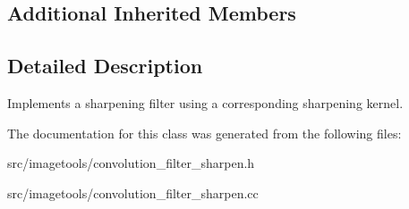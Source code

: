 \subsection*{Additional Inherited Members}


\subsection{Detailed Description}
Implements a sharpening filter using a corresponding sharpening kernel. 

The documentation for this class was generated from the following files\+:\begin{DoxyCompactItemize}
\item 
src/imagetools/convolution\+\_\+filter\+\_\+sharpen.\+h\item 
src/imagetools/convolution\+\_\+filter\+\_\+sharpen.\+cc\end{DoxyCompactItemize}
